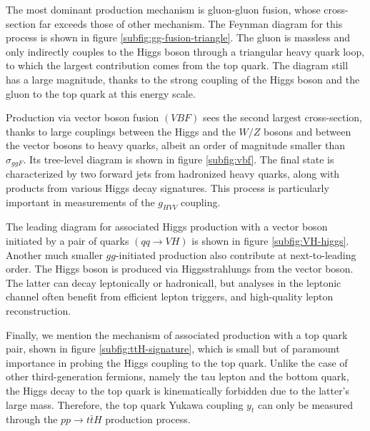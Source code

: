 The most dominant production mechanism is gluon-gluon fusion, whose cross-section far exceeds those of other mechanism. The Feynman diagram for this process is shown in figure \ref{subfig:gg-fusion-triangle}. The gluon is massless and only indirectly couples to the Higgs boson through a triangular heavy quark loop, to which the largest contribution comes from the top quark. The diagram still has a large magnitude, thanks to the strong coupling of the Higgs boson and the gluon to the top quark at this energy scale. 

Production via vector boson fusion $(VBF)$ sees the second largest cross-section, thanks to large couplings between the Higgs and the $W/Z$ bosons and between the vector bosons to heavy quarks, albeit an order of magnitude smaller than $\sigma_{ggF}$. Its tree-level diagram is shown in figure \ref{subfig:vbf}. The final state is characterized by two forward jets from hadronized heavy quarks, along with products from various Higgs decay signatures. This process is particularly important in measurements of the $g_{HVV}$ coupling.

The leading diagram for associated Higgs production with a vector boson initiated by a pair of quarks $(qq\rightarrow VH)$ is shown in figure \ref{subfig:VH-higgs}. Another much smaller $gg$-initiated production also contribute at next-to-leading order. The Higgs boson is produced via Higgsstrahlungs from the vector boson. The latter can decay leptonically or hadronicall, but analyses in the leptonic channel often benefit from efficient lepton triggers, and high-quality lepton reconstruction. 

Finally, we mention the mechanism of associated production with a top quark pair, shown in figure \ref{subfig:ttH-signature}, which is small but of paramount importance in probing the Higgs coupling to the top quark. Unlike the case of other third-generation fermions, namely the tau lepton and the bottom quark, the Higgs decay to the top quark is kinematically forbidden due to the latter's large mass. Therefore, the top quark Yukawa coupling $y_t$ can only be measured through the $pp\rightarrow t\bar{t}H$ production process. 

